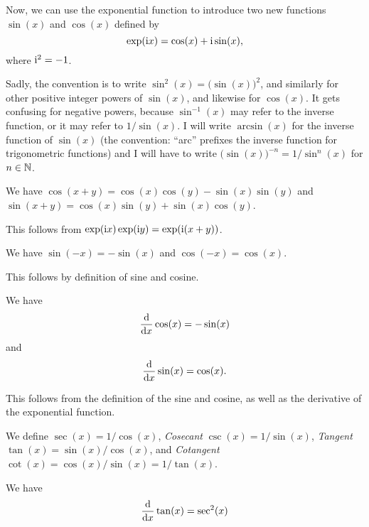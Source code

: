 \begin{node}[Trigonometry]\label{calculus-000S}%
Now, we can use the exponential function  to
introduce two new functions $\sin(x)$ and $\cos(x)$ defined by
\[\exp(\mathrm{i} x)=\cos(x)+\mathrm{i}\sin(x),\]
where $\mathrm{i}^{2}=-1$.

\begin{node}[Conventions]\label{calculus-000X}%
Sadly, the convention is to write $\sin^{2}(x)=\bigl(\sin(x)\bigr)^{2}$,
and similarly for other positive integer powers of $\sin(x)$, and
likewise for $\cos(x)$. It gets confusing for negative powers, because
$\sin^{-1}(x)$ may refer to the inverse function, or it may refer to
$1/\sin(x)$. I will write $\arcsin(x)$ for the inverse function of
$\sin(x)$ (the convention: ``arc'' prefixes the inverse function for
trigonometric functions) and I will have to write
$\bigl(\sin(x)\bigr)^{-n}=1/\sin^{n}(x)$ for $n\in\mathbb{N}$.
\end{node}

\begin{lemma}\label{calculus-000T}
We have $\cos(x+y)=\cos(x)\cos(y)-\sin(x)\sin(y)$ and $\sin(x+y)=\cos(x)\sin(y)+\sin(x)\cos(y)$.
\end{lemma}

This follows from $\exp(\mathrm{i} x)\exp(\mathrm{i} y)=\exp(\mathrm{i}(x+y))$.

\begin{lemma}\label{calculus-000Y}%
We have $\sin(-x)=-\sin(x)$ and $\cos(-x)=\cos(x)$.
\end{lemma}

This follows by definition of sine and cosine.

\begin{theorem}\label{calculus-000Z}%
  We have
  \[\frac{\mathrm{d}}{\mathrm{d} x}\cos(x)=-\sin(x)\]
  and
  \[\frac{\mathrm{d}}{\mathrm{d} x}\sin(x)=\cos(x).\]
\end{theorem}
This follows from the definition of the sine and cosine, as well as the
derivative of the exponential function.

\begin{definition}\label{calculus-0010}%
We define  $\sec(x)=1/\cos(x)$, \emph{Cosecant}
$\csc(x)=1/\sin(x)$, \emph{Tangent} $\tan(x)=\sin(x)/\cos(x)$, and
\emph{Cotangent} $\cot(x)=\cos(x)/\sin(x)=1/\tan(x)$.
\end{definition}

\begin{theorem}\label{calculus-0011}%
  We have
  \[\frac{\mathrm{d}}{\mathrm{d} x}\tan(x)=\sec^{2}(x)\]
\end{theorem}


\end{node}
